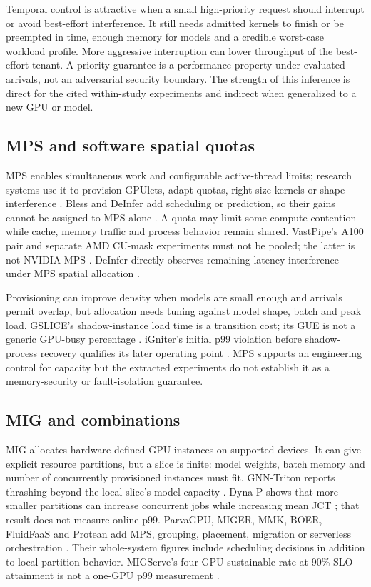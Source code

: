 \documentclass[12pt,a4paper]{article}
\begin{document}
Temporal control is attractive when a small high-priority request should interrupt or avoid best-effort interference. It still needs admitted kernels to finish or be preempted in time, enough memory for models and a credible worst-case workload profile. More aggressive interruption can lower throughput of the best-effort tenant. A priority guarantee is a performance property under evaluated arrivals, not an adversarial security boundary. The strength of this inference is direct for the cited within-study experiments and indirect when generalized to a new GPU or model.

\subsection{MPS and software spatial quotas}
MPS enables simultaneous work and configurable active-thread limits; research systems use it to provision GPUlets, adapt quotas, right-size kernels or shape interference \cite{gpulet,gslice,vastpipe,igniter,fastgshare,admix,deinfer}. Bless and DeInfer add scheduling or prediction, so their gains cannot be assigned to MPS alone \cite{bless,deinfer}. A quota may limit some compute contention while cache, memory traffic and process behavior remain shared. VastPipe's A100 pair and separate AMD CU-mask experiments must not be pooled; the latter is not NVIDIA MPS \cite{vastpipe}. DeInfer directly observes remaining latency interference under MPS spatial allocation \cite{deinfer}.

Provisioning can improve density when models are small enough and arrivals permit overlap, but allocation needs tuning against model shape, batch and peak load. GSLICE's shadow-instance load time is a transition cost; its GUE is not a generic GPU-busy percentage \cite{gslice}. iGniter's initial p99 violation before shadow-process recovery qualifies its later operating point \cite{igniter}. MPS supports an engineering control for capacity but the extracted experiments do not establish it as a memory-security or fault-isolation guarantee.

\subsection{MIG and combinations}
MIG allocates hardware-defined GPU instances on supported devices. It can give explicit resource partitions, but a slice is finite: model weights, batch memory and number of concurrently provisioned instances must fit. GNN-Triton reports thrashing beyond the local slice's model capacity \cite{gnntriton}. Dyna-P shows that more smaller partitions can increase concurrent jobs while increasing mean JCT \cite{dynap}; that result does not measure online p99. ParvaGPU, MIGER, MMK, BOER, FluidFaaS and Protean add MPS, grouping, placement, migration or serverless orchestration \cite{parva,miger,mmk,boer,fluidfaas,protean}. Their whole-system figures include scheduling decisions in addition to local partition behavior. MIGServe's four-GPU sustainable rate at 90\% SLO attainment is not a one-GPU p99 measurement \cite{migserve}.
\end{document}
